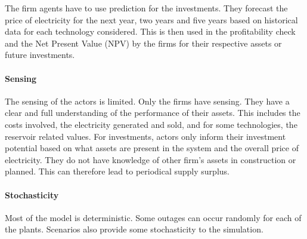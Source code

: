 The firm agents have to use prediction for the investments. They forecast the price of electricity for the next year, two years and five years based on historical data for each technology considered. This is then used in the profitability check and the Net Present Value (NPV) by the firms for their respective assets or future investments.

\paragraph{Sensing}

The sensing of the actors is limited. Only the firms have sensing. They have a clear and full understanding of the performance of their assets. This includes the costs involved, the electricity generated and sold, and for some technologies, the reservoir related values. For investments, actors only inform their investment potential based on what assets are present in the system and the overall price of electricity. They do not have knowledge of other firm's assets in construction or planned. This can therefore lead to periodical supply surplus.

\paragraph{Stochasticity}

Most of the model is deterministic. Some outages can occur randomly for each of the plants. Scenarios also provide some stochasticity to the simulation.

